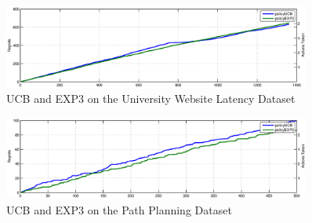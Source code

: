 \documentclass{article}
\begin{document}
\begin{figure}[h]
	\centering
	\includegraphics[width = 0.9\textwidth]{images/plot521.eps}
	\caption{UCB and EXP3 on the University Website Latency Dataset}
	\label{plot521}
\end{figure}

\begin{figure}[h]
	\centering
	\includegraphics[width = 0.9\textwidth]{images/plot531.eps}
	\caption{UCB and EXP3 on the Path Planning Dataset}
	\label{plot531}
\end{figure}


		
\end{document}
